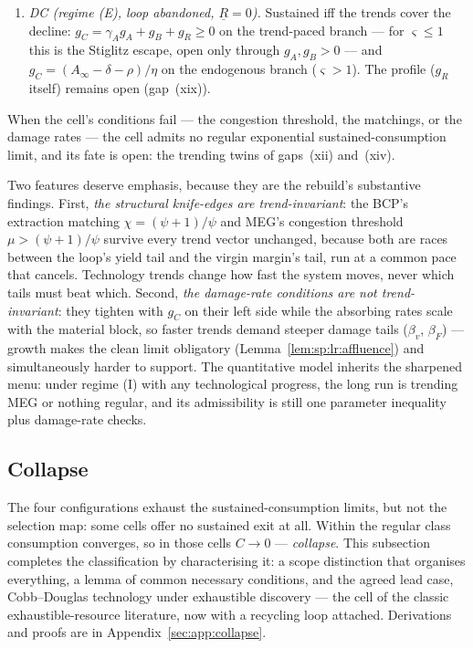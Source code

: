 \begin{proposition}
\begin{enumerate}
    $\eta g_C-\beta_vm_P\le\mu g_m$ and $g_C-\beta_Fm_P\le\mu g_m$. On the trend-paced
    branch this is the fate of the former SS cell: material throughput grows at
    $\left(\gamma_Ag_A+g_B\right)/\mu$ --- absolute decoupling exactly in the limit
    $\mu\to\infty$, relative decoupling (rate gap $g_C-g_m>0$) for every finite $\mu$.
    \item \emph{DC (regime (E), loop abandoned, $\underline R=0$).} Sustained iff the trends
    cover the decline: $g_C=\gamma_Ag_A+g_B+g_R\ge0$ on the trend-paced branch --- for
    $\varsigma\le1$ this is the Stiglitz escape, open only through $g_A,g_B>0$ --- and
    $g_C=\left(A_\infty-\delta-\rho\right)/\eta$ on the endogenous branch
    ($\varsigma>1$). The profile ($g_R$ itself) remains open (gap~(xix)).
\end{enumerate}
When the cell's conditions fail --- the congestion threshold, the matchings, or the damage
rates --- the cell admits no regular exponential sustained-consumption limit, and its fate is
open: the trending twins of gaps~(xii) and~(xiv).
\end{proposition}

Two features deserve emphasis, because they are the rebuild's substantive findings. First,
\emph{the structural knife-edges are trend-invariant}: the BCP's extraction matching
$\chi=\left(\psi+1\right)/\psi$ and MEG's congestion threshold $\mu>\left(\psi+1\right)/\psi$
survive every trend vector unchanged, because both are races between the loop's yield tail
and the virgin margin's tail, run at a common pace that cancels. Technology trends change how
fast the system moves, never which tails must beat which. Second, \emph{the damage-rate
conditions are not trend-invariant}: they tighten with $g_C$ on their left side while the
absorbing rates scale with the material block, so faster trends demand steeper damage tails
($\beta_v$, $\beta_F$) --- growth makes the clean limit obligatory
(Lemma~\ref{lem:sp:lr:affluence}) and simultaneously harder to support. The quantitative
model inherits the sharpened menu: under regime (I) with any technological progress, the
long run is trending MEG or nothing regular, and its admissibility is still one parameter
inequality plus damage-rate checks.

\subsection{Collapse}\label{sec:sp:longrun:collapse}

The four configurations exhaust the sustained-consumption limits, but not the selection map:
some cells offer no sustained exit at all. Within the regular class consumption converges,
so in those cells $C\to0$ --- \emph{collapse}. This subsection completes the classification
by characterising it: a scope distinction that organises everything, a lemma of common
necessary conditions, and the agreed lead case, Cobb--Douglas technology under exhaustible
discovery --- the cell of the classic exhaustible-resource literature, now with a recycling
loop attached. Derivations and proofs are in Appendix~\ref{sec:app:collapse}.

